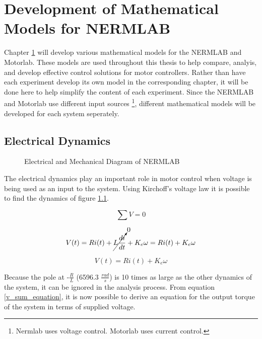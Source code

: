 
\cleardoublepage

\chapter{Development of Mathematical Models for NERMLAB}
\label{chp4}

Chapter \ref{chp4} will develop various mathematical models for the NERMLAB and Motorlab. These models are used throughout this thesis to help compare, analyis, and develop effective control solutions for motor controllers. Rather than have each experiment develop its own model in the corresponding chapter, it will be done here to help simplify the content of each experiment. Since the NERMLAB and Motorlab use different input sources \footnote{Nermlab uses voltage control. Motorlab uses current control.}, different mathematical models will be developed for each system seperately.

\section{Electrical Dynamics}
\label{electrical_dynamics}

\begin{figure}[H]
	\centering
	\caption[Electrical and Mechanical Schematic of NERMLAB]{Electrical and Mechanical Diagram of NERMLAB}
	
	\label{nermlab_electrical_mechanical_diagram}
\end{figure}

The electrical dynamics play an important role in motor control when voltage is being used as an input to the system. Using Kirchoff's voltage law it is possible to find the dynamics of figure \ref{nermlab_electrical_mechanical_diagram}.

\[\sum V = 0\]


\[V(t) = Ri(t) + \cancelto{0}{L\frac{di}{dt}} + K_e\omega = Ri(t) + K_e\omega\]


\begin{equation}
\label{v_sum_equation}
V(t) = Ri(t) + K_e\omega
\end{equation}

Because the pole at -$\frac{R}{L}$ (6596.3 $\frac{rad}{s}$) is 10 times as large as the other dynamics of the system, it can be ignored in the analysis process. From equation \ref{v_sum_equation}, it is now possible to derive an equation for the output torque of the system in terms of supplied voltage.

